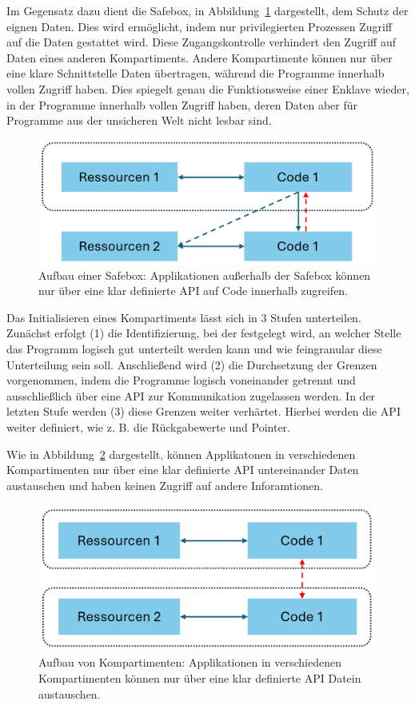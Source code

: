 Im Gegensatz dazu dient die Safebox, in Abbildung~\ref{fig:Safebox} dargestellt, dem Schutz der eignen Daten. Dies wird ermöglicht, indem nur privilegierten Prozessen Zugriff auf die Daten gestattet wird. Diese Zugangskontrolle verhindert den Zugriff auf Daten eines anderen Kompartiments. Andere Kompartimente können nur über eine klare Schnittstelle Daten übertragen, während die Programme innerhalb vollen Zugriff haben. 
Dies spiegelt genau die Funktionsweise einer Enklave wieder, in der Programme innerhalb vollen Zugriff haben, deren Daten aber für Programme aus der unsicheren Welt nicht lesbar sind.
\begin{figure}[h]
    \centering
    \includegraphics[width=0.7\linewidth]{Grafiken/Safebox.png}
    \caption{Aufbau einer Safebox: Applikationen außerhalb der Safebox können nur über eine klar definierte API auf Code innerhalb zugreifen.}
    \label{fig:Safebox}
\end{figure}

Das Initialisieren eines Kompartiments lässt sich in 3 Stufen unterteilen. Zunächst erfolgt (1) die Identifizierung, bei der festgelegt wird, an welcher Stelle das Programm logisch gut unterteilt werden kann und wie feingranular diese Unterteilung sein soll.
Anschließend wird (2) die Durchsetzung der Grenzen vorgenommen, indem die Programme logisch voneinander getrennt und ausschließlich über eine API zur Kommunikation zugelassen werden. 
In der letzten Stufe werden (3) diese Grenzen weiter verhärtet. Hierbei werden die API weiter definiert, wie z. B. die Rückgabewerte und Pointer.

Wie in Abbildung~\ref{fig:Kompartiment} dargestellt, können Applikatonen in verschiedenen Kompartimenten nur über eine klar definierte API untereinander Daten austauschen und haben keinen Zugriff auf andere Inforamtionen.

\begin{figure}[h]
    \centering
    \includegraphics[width=0.7\linewidth]{Grafiken/Kompartiment.png}
    \caption{Aufbau von Kompartimenten: Applikationen in verschiedenen Kompartimenten können nur über eine klar definierte API Datein austauschen.}
    \label{fig:Kompartiment}
\end{figure}

